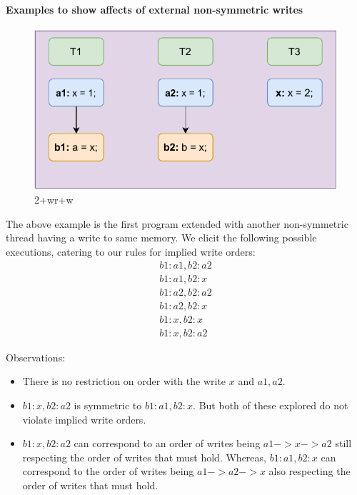         
    \paragraph{Examples to show affects of external non-symmetric writes}
        \begin{figure}[H]
            \centering 
            \includegraphics[scale=0.7]{Example5(2+wr+w).pdf}
            \caption{2+wr+w}
        \end{figure}

        The above example is the first program extended with another non-symmetric thread having a write to same memory. We elicit the following possible executions, catering to our rules for implied write orders: 
        \begin{align*}
            b1:a1 , b2:a2 \\
            b1:a1 , b2:x \\
            b1:a2 , b2:a2 \\
            b1:a2 , b2:x \\
            b1:x , b2:x \\
            b1:x , b2:a2
        \end{align*}

        Observations: 
        \begin{itemize}
            \item There is no restriction on order with the write $x$ and $a1, a2$.
            \item $b1:x , b2:a2$ is symmetric to $b1:a1 , b2:x$. But both of these explored do not violate implied write orders. 
            \item $b1:x , b2:a2$ can correspond to an order of writes being $a1->x->a2$ still respecting the order of writes that must hold. Whereas, $b1:a1 , b2:x$ can correspond to the order of writes being $a1->a2->x$ also respecting the order of writes that must hold. 
        \end{itemize}

